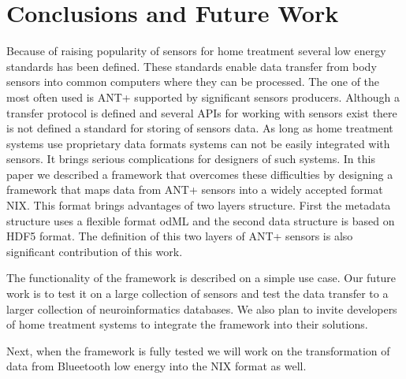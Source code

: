 \documentclass[conference]{IEEEtran}
\begin{document}
\section{Conclusions and Future Work}\label{sec:future-work}

Because of raising popularity of sensors for home treatment several low energy standards has been defined. These standards enable data transfer from body sensors into common computers where they can be processed. The one of the most often used is ANT+ supported by significant sensors producers. Although a transfer protocol is defined and several APIs for working with sensors exist there is not defined a standard for storing of sensors data. As long as home treatment systems use proprietary data formats systems can not be easily integrated with sensors. It brings serious complications for designers of such systems. In this paper we described a framework that overcomes these difficulties by designing a framework that maps data from ANT+ sensors into a widely accepted format NIX. This format brings advantages of two layers structure. First the metadata structure uses a flexible format odML and the second data structure is based on HDF5 format. The definition of this two layers of ANT+ sensors is also significant contribution of this work.

The functionality of the framework is described on a simple use case. Our future work is to test it on a large collection of sensors and test the data transfer to a larger collection of neuroinformatics databases. We also plan to invite developers of home treatment systems to integrate the framework into their solutions.

Next, when the framework is fully tested we will work on the transformation of data from Blueetooth low energy into the NIX format as well.






\end{document}
